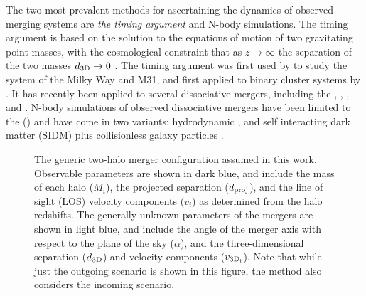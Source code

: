 The two most prevalent methods for ascertaining the dynamics of observed merging systems are \emph{the timing argument} and N-body simulations.  
The timing argument is based on the solution to the equations of motion of two gravitating point masses, with the cosmological constraint that as $z \rightarrow \infty$ the separation of the two masses $d_{\rm 3D} \rightarrow 0$ \citep[for an exposition of this method see][]{Peebles:1993vp}.  The timing argument was first used by \citet{Kahn:1959ds} to study the system of the Milky Way and M31, and first applied to binary cluster systems by \citet{Beers:1982dp}.
It has recently been applied to several dissociative mergers, including the  \citep{Barrena:2002dj},  \citep{Girardi:2008gu},   \citep{Bourdin:2011gr}, and   \citep{Boschin:2012he}.
N-body simulations of observed dissociative mergers have been limited to the  () and have come in two variants: hydrodynamic \citep{Springel:2007bg, Milosavljevic:2007hf, Mastropietro:2008fs}, and self interacting dark matter (SIDM) plus collisionless galaxy particles \citep{Randall:2008hs}.

\begin{figure}
\caption{The generic two-halo merger configuration assumed in this work.  Observable parameters are shown in dark blue, and include the mass of each halo ($M_i$), the  projected separation ($d_{\rm proj}$), and the line of sight (LOS) velocity components ($v_i$) as determined from the halo redshifts. 
The generally unknown parameters of the mergers are shown in light blue, and include the angle of the merger axis with respect to the plane of the sky ($\alpha$), and the three-dimensional separation ($d_{\rm 3D}$) and velocity components ($v_{\rm 3D_i}$).
Note that while just the outgoing scenario is shown in this figure, the method also considers the incoming scenario.
\label{fig_mergerdiagram}}
\end{figure}  

